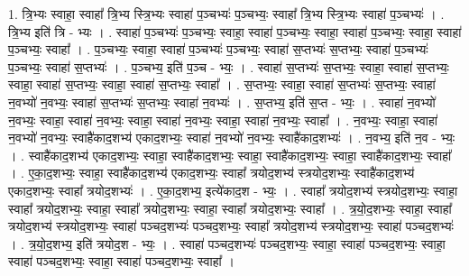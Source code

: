 \documentclass[17pt]{extarticle}
\begin{document}
1. त्रि॒भ्यः स्वाहा॒ स्वाहा᳚ त्रि॒भ्य स्त्रि॒भ्यः स्वाहा॑ प॒ञ्चभ्यः॑ प॒ञ्चभ्यः॒ स्वाहा᳚ त्रि॒भ्य स्त्रि॒भ्यः स्वाहा॑ प॒ञ्चभ्यः॑ । . त्रि॒भ्य इति॑ त्रि - भ्यः । . स्वाहा॑ प॒ञ्चभ्यः॑ प॒ञ्चभ्यः॒ स्वाहा॒ स्वाहा॑ प॒ञ्चभ्यः॒ स्वाहा॒ स्वाहा॑ प॒ञ्चभ्यः॒ स्वाहा॒ स्वाहा॑ प॒ञ्चभ्यः॒ स्वाहा᳚ । . प॒ञ्चभ्यः॒ स्वाहा॒ स्वाहा॑ प॒ञ्चभ्यः॑ प॒ञ्चभ्यः॒ स्वाहा॑ स॒प्तभ्यः॑ स॒प्तभ्यः॒ स्वाहा॑ प॒ञ्चभ्यः॑ प॒ञ्चभ्यः॒ स्वाहा॑ स॒प्तभ्यः॑ । . प॒ञ्चभ्य॒ इति॑ प॒ञ्च - भ्यः॒ । . स्वाहा॑ स॒प्तभ्यः॑ स॒प्तभ्यः॒ स्वाहा॒ स्वाहा॑ स॒प्तभ्यः॒ स्वाहा॒ स्वाहा॑ स॒प्तभ्यः॒ स्वाहा॒ स्वाहा॑ स॒प्तभ्यः॒ स्वाहा᳚ । . स॒प्तभ्यः॒ स्वाहा॒ स्वाहा॑ स॒प्तभ्यः॑ स॒प्तभ्यः॒ स्वाहा॑ न॒वभ्यो॑ न॒वभ्यः॒ स्वाहा॑ स॒प्तभ्यः॑ स॒प्तभ्यः॒ स्वाहा॑ न॒वभ्यः॑ । . स॒प्तभ्य॒ इति॑ स॒प्त - भ्यः॒ । . स्वाहा॑ न॒वभ्यो॑ न॒वभ्यः॒ स्वाहा॒ स्वाहा॑ न॒वभ्यः॒ स्वाहा॒ स्वाहा॑ न॒वभ्यः॒ स्वाहा॒ स्वाहा॑ न॒वभ्यः॒ स्वाहा᳚ । . न॒वभ्यः॒ स्वाहा॒ स्वाहा॑ न॒वभ्यो॑ न॒वभ्यः॒ स्वाहै॑काद॒शभ्य॑ एकाद॒शभ्यः॒ स्वाहा॑ न॒वभ्यो॑ न॒वभ्यः॒ स्वाहै॑काद॒शभ्यः॑ । . न॒वभ्य॒ इति॑ न॒व - भ्यः॒ । . स्वाहै॑काद॒शभ्य॑ एकाद॒शभ्यः॒ स्वाहा॒ स्वाहै॑काद॒शभ्यः॒ स्वाहा॒ स्वाहै॑काद॒शभ्यः॒ स्वाहा॒ 
स्वाहै॑काद॒शभ्यः॒ स्वाहा᳚ । . ए॒का॒द॒शभ्यः॒ स्वाहा॒ स्वाहै॑काद॒शभ्य॑ एकाद॒शभ्यः॒ स्वाहा᳚ त्रयोद॒शभ्य॑ स्त्रयोद॒शभ्यः॒ 
स्वाहै॑काद॒शभ्य॑ एकाद॒शभ्यः॒ स्वाहा᳚ त्रयोद॒शभ्यः॑ । . ए॒का॒द॒शभ्य॒ इत्ये॑काद॒श - भ्यः॒ । . स्वाहा᳚ त्रयोद॒शभ्य॑ स्त्रयोद॒शभ्यः॒ स्वाहा॒ स्वाहा᳚ त्रयोद॒शभ्यः॒ स्वाहा॒ स्वाहा᳚ त्रयोद॒शभ्यः॒ स्वाहा॒ स्वाहा᳚ त्रयोद॒शभ्यः॒ स्वाहा᳚ । . त्र॒यो॒द॒शभ्यः॒ स्वाहा॒ स्वाहा᳚ त्रयोद॒शभ्य॑ स्त्रयोद॒शभ्यः॒ स्वाहा॑ पञ्चद॒शभ्यः॑ पञ्चद॒शभ्यः॒ स्वाहा᳚ त्रयोद॒शभ्य॑ स्त्रयोद॒शभ्यः॒ स्वाहा॑ पञ्चद॒शभ्यः॑ । . त्र॒यो॒द॒शभ्य॒ इति॑ त्रयोद॒श - भ्यः॒ । . स्वाहा॑ पञ्चद॒शभ्यः॑ पञ्चद॒शभ्यः॒ स्वाहा॒ स्वाहा॑ पञ्चद॒शभ्यः॒ स्वाहा॒ स्वाहा॑ पञ्चद॒शभ्यः॒ स्वाहा॒ स्वाहा॑ पञ्चद॒शभ्यः॒ स्वाहा᳚ । \newline
\end{document}
